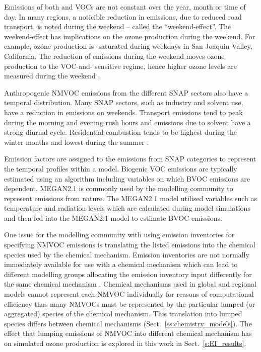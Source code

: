 Emissions of both  and VOCs are not constant over the year, month or time of day.
In many regions, a noticible reduction in  emissions, due to reduced road transport, is noted during the weekend -- called the ``weekend-effect''.
The weekend-effect has implications on the ozone production during the weekend.
For example, ozone production is -saturated during weekdays in San Joaquin Valley, California.
The reduction of  emissions during the weekend moves ozone production to the VOC-and- sensitive regime, hence higher ozone levels are measured during the weekend \citep{Pusede:2014}.

Anthropogenic NMVOC emissions from the different SNAP sectors also have a temporal distribution.
Many SNAP sectors, such as industry and solvent use, have a reduction in emissions on weekends.
Transport emissions tend to peak during the morning and evening rush hours and emissions due to solvent have a strong diurnal cycle.
Residential combustion tends to be highest during the winter months and lowest during the summer \citep{Gon:2011}.

Emission factors are assigned to the emissions from SNAP categories to represent the temporal profiles within a model.
Biogenic VOC emissions are typically estimated using an algorithm including variables on which BVOC emissions are dependent.
MEGAN2.1 \citep{Guenther:2012} is commonly used by the modelling community to represent emissions from nature.
The MEGAN2.1 model utilised variables such as temperature and radiation levels which are calculated during model simulations and then fed into the MEGAN2.1 model to estimate BVOC emissions.

One issue for the modelling community with using emission inventories for specifying NMVOC emissions is translating the listed emissions into the chemical species used by the chemical mechanism.
Emission inventories are not normally immediately available for use with a chemical mechanism which can lead to different modelling groups allocating the emission inventory input differently for the same chemical mechanism \citep{Carter:2015}.
Chemical mechanisms used in global and regional models cannot represent each NMVOC individually for reasons of computational efficiency thus many NMVOCs must be represented by the particular lumped (or aggregated) species of the chemical mechanism.
This translation into lumped species differs between chemical mechanisms (Sect.~\ref{ss:chemistry_models}).
The effect that lumping emissions of NMVOC into different chemical mechanism has on simulated ozone production is explored in this work in Sect.~\ref{s:EI_results}.

